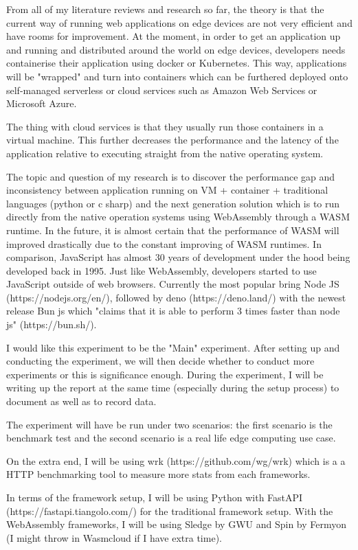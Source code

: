 From all of my literature reviews and research so far, the theory is that the current way of running web applications on edge devices are not very efficient and have rooms for improvement. At the moment, in order to get an application up and running and distributed around the world on edge devices, developers needs containerise their application using docker or Kubernetes. This way, applications will be "wrapped" and turn into containers which can be furthered deployed onto self-managed serverless or cloud services such as Amazon Web Services or Microsoft Azure.

The thing with cloud services is that they usually run those containers in a virtual machine. This further decreases the performance and the latency of the application relative to executing straight from the native operating system.

The topic and question of my research is to discover the performance gap and inconsistency between application running on VM + container + traditional languages (python or c sharp) and the next generation solution which is to run directly from the native operation systems using WebAssembly through a WASM runtime. In the future, it is almost certain that the performance of WASM will improved drastically due to the constant improving of WASM runtimes. In comparison, JavaScript has almost 30 years of development under the hood being developed back in 1995. Just like WebAssembly, developers started to use JavaScript outside of web browsers. Currently the most popular bring Node JS (https://nodejs.org/en/), followed by deno (https://deno.land/) with the newest release Bun js which "claims that it is able to perform 3 times faster than node js" (https://bun.sh/).

I would like this experiment to be the "Main" experiment. After setting up and conducting the experiment, we will then decide whether to conduct more experiments or this is significance enough. During the experiment, I will be writing up the report at the same time (especially during the setup process) to document as well as to record data.

The experiment will have be run under two scenarios: the first scenario is the benchmark test and the second scenario is a real life edge computing use case.

On the extra end, I will be using wrk (https://github.com/wg/wrk) which is a a HTTP benchmarking tool to measure more stats from each frameworks.

In terms of the framework setup, I will be using Python with FastAPI (https://fastapi.tiangolo.com/) for the traditional framework setup. With the WebAssembly frameworks, I will be using Sledge by GWU and Spin by Fermyon (I might throw in Wasmcloud if I have extra time).

